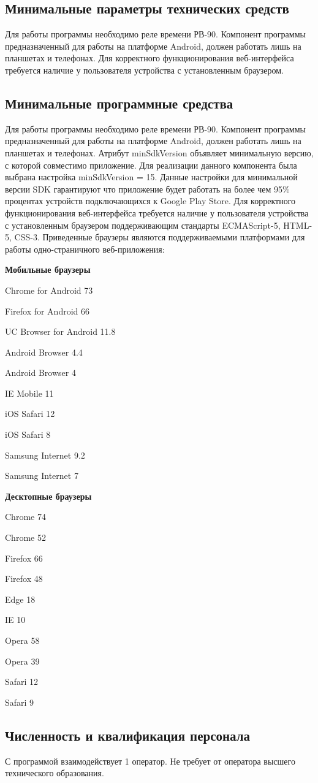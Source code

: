 \subsection{Минимальные параметры технических средств}
Для работы программы необходимо реле времени РВ-90. Компонент программы предназначенный для работы на платформе Android, должен работать лишь на планшетах и телефонах.
Для корректного функционирования веб-интерфейса требуется наличие у пользователя устройства с установленным браузером.


\subsection{Минимальные программные средства}
Для работы программы необходимо реле времени РВ-90. Компонент программы предназначенный для работы на платформе Android, должен работать лишь на планшетах и телефонах. 
Атрибут minSdkVersion объявляет минимальную версию, с которой совместимо приложение.
Для реализации данного компонента была выбрана настройка minSdkVersion = 15. Данные настройки для минимальной версии SDK гарантируют что приложение будет работать на более чем 95\% процентах устройств подключающихся к Google Play Store.
Для корректного функционирования веб-интерфейса требуется наличие у пользователя устройства с установленным браузером поддерживающим стандарты ECMAScript-5, HTML-5, CSS-3. Приведенные браузеры являются поддерживаемыми платформами для работы одно-страничного веб-приложения:

\textbf{Мобильные браузеры}
\begin{my_enumerate}
\item Chrome for Android 73
\item Firefox for Android 66
\item UC Browser for Android 11.8
\item Android Browser 4.4
\item Android Browser 4
\item IE Mobile 11
\item iOS Safari 12
\item iOS Safari 8
\item Samsung Internet 9.2
\item Samsung Internet 7
\end{my_enumerate}

\textbf{Десктопные браузеры}
\begin{my_enumerate}
\item Chrome 74
\item Chrome 52
\item Firefox 66
\item Firefox 48
\item Edge 18
\item IE 10
\item Opera 58
\item Opera 39
\item Safari 12
\item Safari 9
\end{my_enumerate}


\subsection{Численность и квалификация персонала}
С программой взаимодействует 1 оператор. Не требует от оператора высшего технического образования. 
